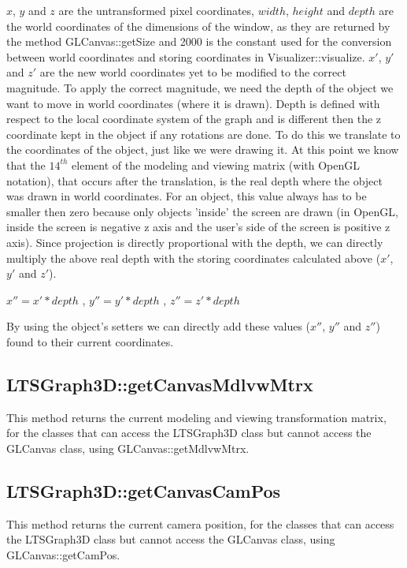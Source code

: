 \documentclass[a4paper]{article}
\begin{document}
$x$, $y$ and $z$ are the untransformed pixel coordinates, $width$, $height$ and $depth$ are the world coordinates of the dimensions of the window, as they are returned by the method GLCanvas::getSize and 2000 is the constant used for the conversion between world coordinates and storing coordinates in Visualizer::visualize. $x'$, $y'$ and $z'$ are the new world coordinates yet to be modified to the correct magnitude. \newline
To apply the correct magnitude, we need the depth of the object we want to move in world coordinates (where it is drawn). Depth is defined with respect to the local coordinate system of the graph and is different then the z coordinate kept in the object if any rotations are done. To do this we translate to the coordinates of the object, just like we were drawing it. At this point we know that the $14^{th}$ element of the modeling and viewing matrix (with OpenGL notation), that occurs after the translation, is the real depth where the object was drawn in world coordinates. For an object, this value always has to be smaller then zero because only objects 'inside' the screen are drawn (in OpenGL, inside the screen is negative z axis and the user's side of the screen is positive z axis). Since projection is directly proportional with the depth, we can directly multiply the above real depth with the storing coordinates calculated above ($x'$, $y'$ and $z'$).
\begin{center}
\begin{math}
x'' = x' * depth
\end{math}
, 
\begin{math}
y'' = y' * depth
\end{math}
, 
\begin{math}
z'' = z' * depth
\end{math}	
\end{center}
By using the object's setters we can directly add these values ($x''$, $y''$ and $z''$) found to their current coordinates.
\subsection{LTSGraph3D::getCanvasMdlvwMtrx}
This method returns the current modeling and viewing transformation matrix, for the classes that can access the LTSGraph3D class but cannot access the GLCanvas class, using GLCanvas::getMdlvwMtrx.
\subsection{LTSGraph3D::getCanvasCamPos}
This method returns the current camera position, for the classes that can access the LTSGraph3D class but cannot access the GLCanvas class, using GLCanvas::getCamPos.
\end{document}
